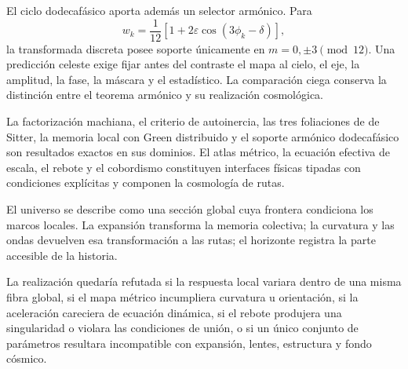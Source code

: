 El ciclo dodecafásico aporta además un selector armónico. Para
\[
 w_k=\frac1{12}
 \left[1+2\varepsilon\cos(3\phi_k-\delta)\right],
\]
la transformada discreta posee soporte únicamente en
\(m=0,\pm3\pmod{12}\). Una predicción celeste exige fijar antes del contraste
el mapa al cielo, el eje, la amplitud, la fase, la máscara y el estadístico.
La comparación ciega conserva la distinción entre el teorema armónico y su
realización cosmológica.

\begin{resultado}
La factorización machiana, el criterio de autoinercia, las tres foliaciones
de de Sitter, la memoria local con Green distribuido y el soporte armónico
dodecafásico son resultados exactos en sus dominios. El atlas métrico, la
ecuación efectiva de escala, el rebote y el cobordismo constituyen interfaces
físicas tipadas con condiciones explícitas y componen la cosmología de rutas.
\end{resultado}

\begin{lecturafisica}
El universo se describe como una sección global cuya frontera condiciona los
marcos locales. La expansión transforma la memoria colectiva; la curvatura y
las ondas devuelven esa transformación a las rutas; el horizonte registra la
parte accesible de la historia.
\end{lecturafisica}

\begin{frontera}
La realización quedaría refutada si la respuesta local variara dentro de una
misma fibra global, si el mapa métrico incumpliera curvatura u orientación,
si la aceleración careciera de ecuación dinámica, si el rebote produjera una
singularidad o violara las condiciones de unión, o si un único conjunto de
parámetros resultara incompatible con expansión, lentes, estructura y fondo
cósmico.
\end{frontera}
